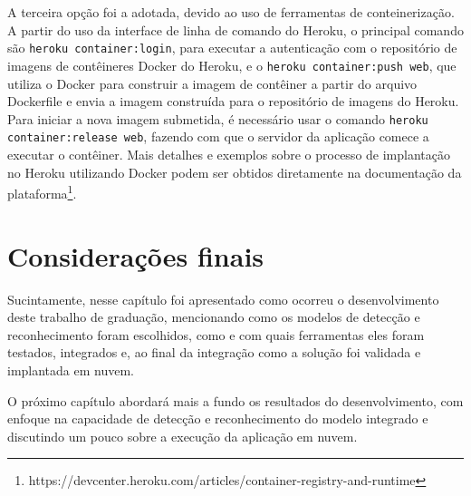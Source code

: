 A terceira opção foi a adotada, devido ao uso de ferramentas de conteinerização. A partir do uso da interface de linha de comando do Heroku, o principal comando são \texttt{heroku container:login}, para executar a autenticação com o repositório de imagens de contêineres Docker do Heroku, e o \texttt{heroku container:push web}, que utiliza o Docker para construir a imagem de contêiner a partir do arquivo Dockerfile e envia a imagem construída para o repositório de imagens do Heroku. Para iniciar a nova imagem submetida, é necessário usar o comando \texttt{heroku container:release web}, fazendo com que o servidor da aplicação comece a executar o contêiner. Mais detalhes e exemplos sobre o processo de implantação no Heroku utilizando Docker podem ser obtidos diretamente na documentação da plataforma\footnote{https://devcenter.heroku.com/articles/container-registry-and-runtime}. 

\section{Considerações finais}
Sucintamente, nesse capítulo foi apresentado como ocorreu o desenvolvimento deste trabalho de graduação, mencionando como os modelos de detecção e 
reconhecimento foram escolhidos, como e com quais ferramentas eles foram testados, integrados e, ao final da integração como a solução foi validada 
e implantada em nuvem.

O próximo capítulo abordará mais a fundo os resultados do desenvolvimento, com enfoque na capacidade de detecção e reconhecimento do modelo integrado 
e discutindo um pouco sobre a execução da aplicação em nuvem.
